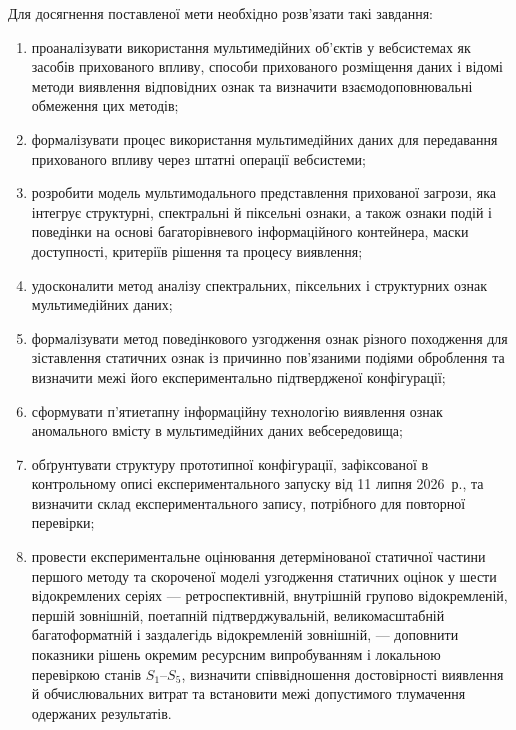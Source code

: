 Для досягнення поставленої мети необхідно розв’язати такі завдання:

\begin{enumerate}[label=\arabic*)]
\item проаналізувати використання мультимедійних об’єктів у вебсистемах як засобів прихованого впливу, способи прихованого розміщення даних і відомі методи виявлення відповідних ознак та визначити взаємодоповнювальні обмеження цих методів;

\item формалізувати процес використання мультимедійних даних для передавання прихованого впливу через штатні операції вебсистеми;

\item розробити модель мультимодального представлення прихованої загрози, яка інтегрує структурні, спектральні й піксельні ознаки, а також ознаки подій і поведінки на основі багаторівневого інформаційного контейнера, маски доступності, критеріїв рішення та процесу виявлення;

\item удосконалити метод аналізу спектральних, піксельних і структурних ознак мультимедійних даних;

\item формалізувати метод поведінкового узгодження ознак різного походження для зіставлення статичних ознак із причинно пов’язаними подіями оброблення та визначити межі його експериментально підтвердженої конфігурації;

\item сформувати п’ятиетапну інформаційну технологію виявлення ознак аномального вмісту в мультимедійних даних вебсередовища;

\item обґрунтувати структуру прототипної конфігурації, зафіксованої в контрольному описі експериментального запуску від 11 липня 2026~р., та визначити склад експериментального запису, потрібного для повторної перевірки;

\item провести експериментальне оцінювання детермінованої статичної частини першого методу та скороченої моделі узгодження статичних оцінок у шести відокремлених серіях --- ретроспективній, внутрішній групово відокремленій, першій зовнішній, поетапній підтверджувальній, великомасштабній багатоформатній і заздалегідь відокремленій зовнішній, --- доповнити показники рішень окремим ресурсним випробуванням і локальною перевіркою станів $S_1$--$S_5$, визначити співвідношення достовірності виявлення й обчислювальних витрат та встановити межі допустимого тлумачення одержаних результатів.
\end{enumerate}

